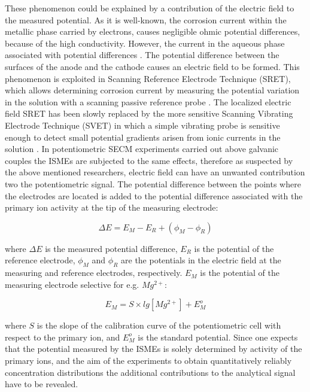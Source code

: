 \documentclass[3p]{elsarticle}
\begin{document}
These phenomenon could be explained by a contribution of the electric field to the measured potential. As it is well-known, the corrosion current within the metallic phase carried by electrons, causes negligible ohmic potential differences, because of the high conductivity. However, the current in the aqueous phase associated with potential differences \cite{Isaacsfield}. 
The potential difference between the surfaces of the anode and the cathode causes an electric field to be formed. 
This phenomenon is exploited in Scanning Reference Electrode Technique (SRET), which allows determining corrosion current by measuring the potential variation in the solution with a scanning passive reference probe \cite{SRET1, SRET2, SRET3, SRET4}. 
The localized electric field SRET has been slowly replaced by the more sensitive Scanning Vibrating Electrode Technique (SVET) in which a simple vibrating probe is sensitive enough to detect small potential gradients arisen from ionic currents in the solution \cite{SVET}. 
In potentiometric SECM experiments carried out above galvanic couples the ISMEs are subjected to the same effects, therefore as suspected by the above mentioned researchers, electric field can have an unwanted contribution two the potentiometric signal. 
The potential difference between the points where the electrodes are located is added to the potential difference associated with the primary ion activity at the tip of the measuring electrode:

\begin{equation}
\Delta E=E_M-E_R + (\phi_M - \phi_R)
\label{eq:potential}
\end{equation}

where $\Delta E$ is the measured potential difference, $E_R$ is the potential of the reference electrode, $\phi_M$ and $\phi_R$ are the potentials in the electric field at the measuring and reference electrodes, respectively. $E_M$ is the potential of the measuring electrode selective for e.g. $Mg^{2+}$:

\begin{equation}
E_M = S \times lg[Mg^{2+}] + E_M^o
\label{eq:measuring}
\end{equation}

where $S$ is the slope of the calibration curve of the potentiometric cell with respect to the primary ion, and $E_M^o$ is the standard potential.
Since one expects that the potential measured by the ISMEs is solely determined by activity of the primary ions, and the aim of the experiments to obtain quantitatively reliably concentration distributions the additional contributions to the analytical signal have to be revealed.
\end{document}
